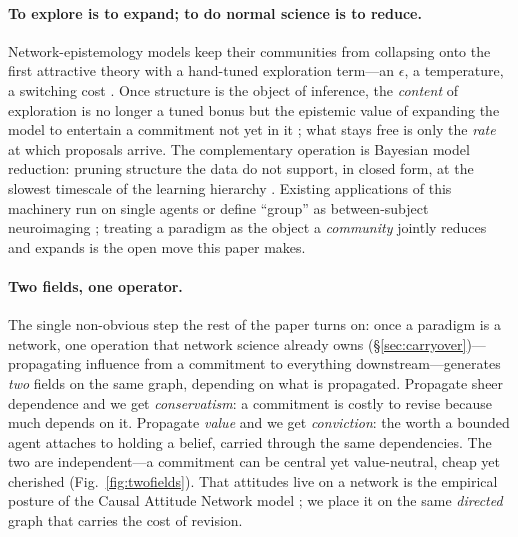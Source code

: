 \documentclass[11pt]{article}
\begin{document}
\paragraph{To explore is to expand; to do normal science is to reduce.}
Network-epistemology models keep their communities from collapsing onto the first attractive theory
with a hand-tuned exploration term---an $\epsilon$, a temperature, a switching cost
\citep{zollman2010,oconnor2019}. Once structure is the object of inference, the \emph{content} of
exploration is no longer a tuned bonus but the epistemic value of expanding the model to entertain a
commitment not yet in it \citep{friston2015,friston2017curiosity}; what stays free is only the
\emph{rate} at which proposals arrive. The complementary operation is Bayesian model reduction:
pruning structure the data do not support, in closed form, at the slowest timescale of the learning
hierarchy \citep{friston2018bmr,neacsu2022}. Existing applications of this machinery run on single
agents \citep{neacsu2022,priorelli2023} or define ``group'' as between-subject neuroimaging
\citep{friston2016peb}; treating a paradigm as the object a \emph{community} jointly reduces and
expands is the open move this paper makes.

\paragraph{Two fields, one operator.}
The single non-obvious step the rest of the paper turns on: once a paradigm is a network, one
operation that network science already owns (\S\ref{sec:carryover})---propagating influence from a
commitment to everything downstream---generates \emph{two} fields on the same graph, depending on
what is propagated. Propagate sheer dependence and we get
\emph{conservatism}: a commitment is costly to revise because much depends on it. Propagate
\emph{value} and we get \emph{conviction}: the worth a bounded agent attaches to holding a belief,
carried through the same dependencies. The two are independent---a commitment can be central yet
value-neutral, cheap yet cherished (Fig.~\ref{fig:twofields}). That attitudes live on a network is
the empirical posture of the Causal Attitude Network model \citep{dalege2016}; we place it on the
same \emph{directed} graph that carries the cost of revision.
\end{document}
